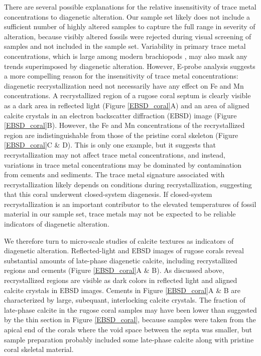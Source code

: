 \documentclass[5p, authoryear]{elsarticle}
\begin{document}
There are several possible explanations for the relative insensitivity of trace metal concentrations to diagenetic alteration. Our sample set likely does not include a sufficient number of highly altered samples to capture the full range in severity of alteration, because visibly altered fossils were rejected during visual screening of samples and not included in the sample set. Variability in primary trace metal concentrations, which is large among modern brachiopods \citep{Brand2003}, may also mask any trends superimposed by diagenetic alteration. However, E-probe analysis suggests a more compelling reason for the insensitivity of trace metal concentrations: diagenetic recrystallization need not necessarily have any effect on Fe and Mn concentrations. A recrystallized region of a rugose coral septum is clearly visible as a dark area in reflected light (Figure \ref{EBSD_coral}A) and an area of aligned calcite crystals in an electron backscatter diffraction (EBSD) image (Figure \ref{EBSD_coral}B). However, the Fe and Mn concentrations of the recrystallized region are indistinguishable from those of the pristine coral skeleton (Figure \ref{EBSD_coral}C \& D). This is only one example, but it suggests that recrystallization may not affect trace metal concentrations, and instead, variations in trace metal concentrations may be dominated by contamination from cements and sediments. The trace metal signature associated with recrystallization likely depends on conditions during recrystallization, suggesting that this coral underwent closed-system diagenesis. If closed-system recrystallization is an important contributor to the elevated temperatures of fossil material in our sample set, trace metals may not be expected to be reliable indicators of diagenetic alteration. 

We therefore turn to micro-scale studies of calcite textures as indicators of diagenetic alteration. Reflected-light and EBSD images of rugose corals reveal substantial amounts of late-phase diagenetic calcite, including recrystallized regions and cements (Figure \ref{EBSD_coral}A \& B). As discussed above, recrystallized regions are visible as dark colors in reflected light and aligned calcite crystals in EBSD images. Cements in Figure \ref{EBSD_coral}A \& B are characterized by large, subequant, interlocking calcite crystals. The fraction of late-phase calcite in the rugose coral samples may have been lower than suggested by the thin section in Figure \ref{EBSD_coral}, because samples were taken from the apical end of the corals where the void space between the septa was smaller, but sample preparation probably included some late-phase calcite along with pristine coral skeletal material. 
\end{document}
